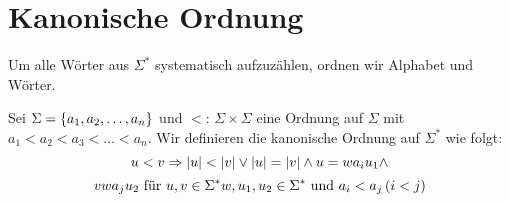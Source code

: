 \section{Kanonische Ordnung}
Um alle Wörter aus $\Sigma^*$ systematisch aufzuzählen, ordnen wir Alphabet und Wörter.
\begin{definition}
Sei $\Sigma = \left\{a_1, a_2, \dots, a_n\right\}$ und $<$: $\Sigma \times \Sigma$ eine Ordnung auf $\Sigma$ mit $a_1 < a_2 < a_3 < \dots < a_n$. Wir definieren die kanonische Ordnung auf $\Sigma^*$ wie folgt:
\[u < v \Rightarrow \left|u\right| < \left|v\right| \vee \left|u\right| = \left|v\right| \wedge u = wa_i u_1 \wedge\]\[ v w a_j u_2 \text{ für } u, v \in \Sigma^* w, u_1, u_2 \in \Sigma^* \text{ und } a_i < a_j \left(i < j\right)\]
\end{definition}

